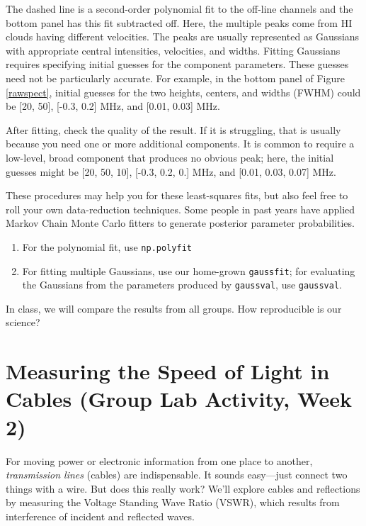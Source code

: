 \documentclass[11pt,preprint]{aastex}
\begin{document}
The dashed line is a second-order polynomial fit to the off-line
channels and the bottom panel has this fit subtracted off.  Here, the
multiple peaks come from HI clouds having different velocities. The
peaks are usually represented as Gaussians with appropriate central
intensities, velocities, and widths.  Fitting Gaussians requires
specifying initial guesses for the component parameters. These guesses
need not be particularly accurate. For example, in the bottom panel of Figure
\ref{rawspect}, initial guesses for the two heights, centers, and widths
(FWHM) could be [20, 50], [-0.3, 0.2] MHz, and [0.01, 0.03] MHz.

After
fitting, check the quality of the result. If it is struggling,
that is usually because you need one or more additional components. It is
common to require a low-level, broad component that produces no obvious
peak; here, the initial guesses might be [20, 50, 10], [-0.3, 0.2, 0.]
MHz, and [0.01, 0.03, 0.07] MHz. 

These procedures may help you for these least-squares fits, but also
feel free to roll your own data-reduction techniques. Some people in past years have
applied Markov Chain Monte Carlo fitters to generate posterior parameter probabilities.
\begin{enumerate}
\item For the polynomial fit, use {\tt np.polyfit}

\item For fitting multiple Gaussians, use our home-grown {\tt gaussfit}; for
  evaluating the Gaussians from the parameters produced by {\tt gaussval}, 
  use {\tt gaussval}.
\end{enumerate}

\noindent
In class, we will compare the results from all groups. How reproducible is
our science?

\section {Measuring the Speed of Light in Cables (Group Lab Activity, Week 2)}
\label{expt}

\noindent
For moving power or electronic information from one place to
another, {\it transmission lines} (cables) are
indispensable. It sounds easy---just connect two things with a wire. But
does this really work? We'll explore cables and reflections
by measuring the Voltage Standing Wave Ratio (VSWR), which results from
interference of incident and reflected waves.
\end{document}
